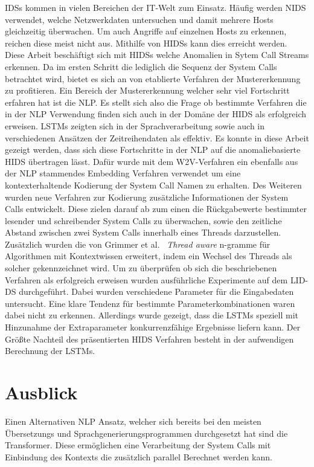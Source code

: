 \acp{IDS} kommen in vielen Bereichen der IT-Welt zum Einsatz.
Häufig werden \ac{NIDS} verwendet, welche Netzwerkdaten untersuchen und damit mehrere Hosts gleichzeitig überwachen.
Um auch Angriffe auf einzelnen Hosts zu erkennen, reichen diese meist nicht aus.
Mithilfe von \acp{HIDS} kann dies erreicht werden.
Diese Arbeit beschäftigt sich mit \acp{HIDS} welche Anomalien in Sytem Call Streams erkennen. 
Da im ersten Schritt die lediglich die Sequenz der System Calls betrachtet wird, bietet es sich an von etablierte Verfahren der Mustererkennung zu profitieren.
Ein Bereich der Mustererkennung welcher sehr viel Fortschritt erfahren hat ist die \ac{NLP}.
Es stellt sich also die Frage ob bestimmte Verfahren die in der \ac{NLP} Verwendung finden sich auch in der Domäne der \ac{HIDS} als erfolgreich erweisen.
\acp{LSTM} zeigten sich in der Sprachverarbeitung sowie auch in verschiedenen Ansätzen der Zeitreihendaten als effektiv.
Es konnte in diese Arbeit gezeigt werden, dass sich diese Fortschritte in der \ac{NLP} auf die anomaliebasierte \ac{HIDS} übertragen lässt.
Dafür wurde mit dem \ac{W2V}-Verfahren ein ebenfalls aus der \ac{NLP} stammendes Embedding Verfahren verwendet um eine kontexterhaltende Kodierung der System Call Namen zu erhalten.
Des Weiteren wurden neue Verfahren zur Kodierung zusätzliche Informationen der System Calls entwickelt.
Diese zielen darauf ab zum einen die Rückgabewerte bestimmter lesender und schreibender System Calls zu überwachen, sowie den zeitliche Abstand zwischen zwei System Calls innerhalb eines Threads darzustellen. 
Zusätzlich wurden die von Grimmer et al.~\cite{IDSTHREADGRIMMER2021} \textit{Thread aware} n-gramme für Algorithmen mit Kontextwissen erweitert, indem ein Wechsel des Threads als solcher gekennzeichnet wird.
Um zu überprüfen ob sich die beschriebenen Verfahren als erfolgreich erweisen wurden ausführliche Experimente auf dem \ac{LID-DS} durchgeführt.
Dabei wurden verschiedene Parameter für die Eingabedaten untersucht.
Eine klare Tendenz für bestimmte Parameterkombinationen waren dabei nicht zu erkennen.
Allerdings wurde gezeigt, dass die \acp{LSTM} speziell mit Hinzunahme der Extraparameter konkurrenzfähige Ergebnisse liefern kann.
Der Größte Nachteil des präsentierten \ac{HIDS} Verfahren besteht in der aufwendigen Berechnung der \acp{LSTM}.

\section{Ausblick}
Einen Alternativen \ac{NLP} Ansatz, welcher sich bereits bei den meisten Übersetzungs und Sprachgenerierungsprogrammen durchgesetzt hat sind die Transformer.
Diese ermöglichen eine Verarbeitung der System Calls mit Einbindung des Kontexts die zusätzlich parallel Berechnet werden kann.

